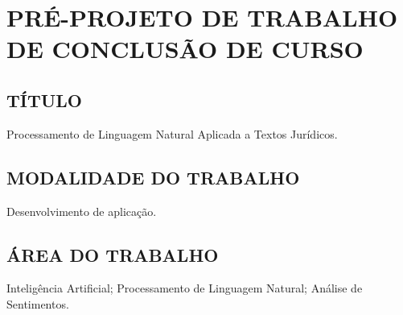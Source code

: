
\chapter{PRÉ-PROJETO DE TRABALHO DE CONCLUSÃO DE CURSO}
\label{chap:proposta}

\section{TÍTULO}
\label{sec:titulo}
Processamento de Linguagem Natural Aplicada a Textos Jurídicos.

\section{MODALIDADE DO TRABALHO}
\label{sec:modalidade}
Desenvolvimento de aplicação.

\section{ÁREA DO TRABALHO}
\label{sec:area}
Inteligência Artificial; Processamento de Linguagem Natural; Análise de Sentimentos.

